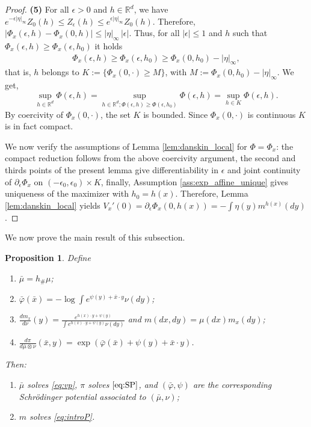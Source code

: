 \documentclass[reqno, a4paper]{amsart}
\theoremstyle{plain}
\newtheorem{proposition}[theorem]{Proposition}
\theoremstyle{definition}
\theoremstyle{remark}
\numberwithin{equation}{section}
\numberwithin{theorem}{section}
\newcommand{\R}{\mathbb{R}}
\begin{document}
\begin{proof}
		\textbf{(5)} For all $\epsilon > 0$ and $h \in \R^d$, we have 
		$ e^{-\epsilon |\eta|_\infty}Z_0(h) \leq Z_\epsilon(h) \leq e^{\epsilon |\eta|_\infty}Z_0(h)$. Therefore, $|\Phi_x(\epsilon,h)-\Phi_x(0,h)|
		\le
		|\eta|_\infty\,|\epsilon|$. Thus, for all $|\epsilon| \leq 1$ and $h$ such that $\Phi_x(\epsilon,h) \geq \Phi_x(\epsilon,h_0)$ it holds 
		\begin{align*}
			\Phi_x(\epsilon,h)
			\ge \Phi_x(\epsilon,h_0)
			\ge \Phi_x(0,h_0)-|\eta|_\infty,
		\end{align*}
		that is, $h$ belongs to $K:=\{\Phi_x(0,\cdot) \geq M\}$, with $M := \Phi_x(0,h_0) -  | \eta |_\infty$. We get,  $$\sup_{h\in \R^d}\Phi(\epsilon,h)= \sup_{h\in \R^d ; \Phi(\epsilon,h) \geq \Phi(\epsilon,h_0) }  \Phi(\epsilon,h) = \sup_{h\in K}\Phi(\epsilon,h).$$ By coercivity of $\Phi_x(0,\cdot)$, the set $K$  is bounded. Since  $\Phi_x(0,\cdot)$ is continuous $K$ is in fact compact. 
		
		We now verify the assumptions of Lemma \ref{lem:danskin_local} for $\Phi = \Phi_x$: the compact reduction follows from the above coercivity argument, the second and thirds points of the present lemma give differentiability in $\epsilon$ and joint continuity of $\partial_{\epsilon}\Phi_x$ on  $(-\epsilon_0,\epsilon_0)\times K$, finally, Assumption \eqref{ass:exp_affine_unique} gives uniqueness of the maximizer with $h_0 = h(x)$. Therefore, Lemma \ref{lem:danskin_local} yields $V_x'(0)=\partial_\epsilon \Phi_x(0,h(x)) = - \int \eta(y) m^{h(x)}(dy)$.
	\end{proof}
	
	We now prove the main result of this subsection.
	
	
	\begin{proposition}\label{pro:from_D_to_VP}
		Define 
		\begin{enumerate}
			\item $\bar \mu = h_\# \mu$;
			\item  $\bar\varphi(\bar x) = -\log \int e^{\psi(y)+\bar x \cdot y} \nu(dy)$;
			\item $\frac{dm_x}{d\nu}(y) = \frac{e^{h(x)\cdot y + \psi(y)}}{\int e^{h(x)\cdot y + \psi(y)} \nu(dy)}$ and $m(dx,dy) = \mu(dx)m_x(dy)$;
			\item  $\frac{d \pi}{d \bar \mu \otimes  \nu}(\bar x,y) =  \exp\left( \bar\varphi (\bar x) + \psi(y) + \bar x \cdot y\right)$.
		\end{enumerate}
		Then:
		\begin{enumerate}
			\item $\bar \mu$ solves \eqref{eq:vp}, $\pi$ solves $\eqref{eq:SP}$, and $(\bar\varphi,\psi)$ are the corresponding Schrödinger potential associated to $(\bar \mu,\nu)$;
			\item $m$ solves \eqref{eq:introP}.
		\end{enumerate}
	\end{proposition}
	
\end{document}
